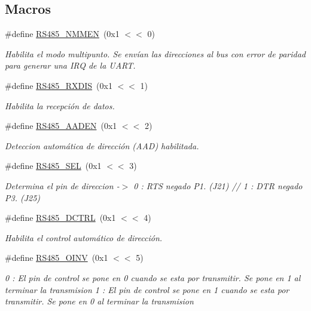 \subsection*{Macros}
\begin{DoxyCompactItemize}
\item 
\#define \hyperlink{group___r_s485_m_o_d_e_ga124bdfe48f8f5794d2ce15f7de7120ff}{R\+S485\+\_\+\+N\+M\+M\+EN}~(0x1 $<$$<$ 0)
\begin{DoxyCompactList}\small\item\em Habilita el modo multipunto. Se envían las direcciones al bus con error de paridad para generar una I\+RQ de la U\+A\+RT. \end{DoxyCompactList}\item 
\#define \hyperlink{group___r_s485_m_o_d_e_ga6dd71ac874eee782a027c667162d2401}{R\+S485\+\_\+\+R\+X\+D\+IS}~(0x1 $<$$<$ 1)
\begin{DoxyCompactList}\small\item\em Habilita la recepción de datos. \end{DoxyCompactList}\item 
\#define \hyperlink{group___r_s485_m_o_d_e_ga1b63fc40ac9dea74f6a3822c7e45a0b1}{R\+S485\+\_\+\+A\+A\+D\+EN}~(0x1 $<$$<$ 2)
\begin{DoxyCompactList}\small\item\em Deteccion automática de dirección (A\+AD) habilitada. \end{DoxyCompactList}\item 
\#define \hyperlink{group___r_s485_m_o_d_e_gaab560420636565a39ce5ddc3539438b3}{R\+S485\+\_\+\+S\+EL}~(0x1 $<$$<$ 3)
\begin{DoxyCompactList}\small\item\em Determina el pin de direccion -\/$>$ 0 \+: R\+TS negado P1. (J21) // 1 \+: D\+TR negado P3. (J25) \end{DoxyCompactList}\item 
\#define \hyperlink{group___r_s485_m_o_d_e_gad273c8e4d740c13bd42b605f01c7602a}{R\+S485\+\_\+\+D\+C\+T\+RL}~(0x1 $<$$<$ 4)
\begin{DoxyCompactList}\small\item\em Habilita el control automático de dirección. \end{DoxyCompactList}\item 
\#define \hyperlink{group___r_s485_m_o_d_e_ga4067a15fda5fce2f25e4e722067d41d7}{R\+S485\+\_\+\+O\+I\+NV}~(0x1 $<$$<$ 5)
\begin{DoxyCompactList}\small\item\em 0 \+: El pin de control se pone en 0 cuando se esta por transmitir. Se pone en 1 al terminar la transmision 1 \+: El pin de control se pone en 1 cuando se esta por transmitir. Se pone en 0 al terminar la transmision \end{DoxyCompactList}\end{DoxyCompactItemize}


